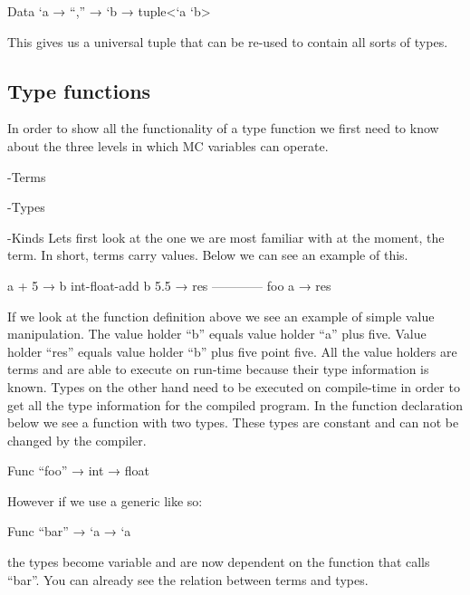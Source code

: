 \begin{code}
	Data `a → “,” → `b → tuple<`a `b>
\end{code}

This gives us a universal tuple that can be re-used to contain all sorts of types.

\subsection{Type functions}

In order to show all the functionality of a type function we first need to know about the three levels in which  MC variables can operate.

-Terms 

-Types

-Kinds
\linebreak
Lets first look at the one we are most familiar with at the moment, the term.
\linebreak
In short, terms carry values. Below we can see an example of this.

\begin{code}
	a + 5 → b
	int-float-add b 5.5 → res
	------------
	foo a → res
\end{code}

If we look at the function definition above we see an example of simple value manipulation. The value holder “b” equals value holder “a” plus five. Value holder “res” equals value holder “b” plus five point five.
\linebreak
All the value holders are terms and are able to execute on run-time because their type information is known.
\linebreak
Types on the other hand need to be executed on compile-time in order to get all the type information for the compiled program.
\linebreak
In the function declaration below we see a function with two types. 
These types are constant and can not be changed by the compiler.

\begin{code}
	Func “foo” → int → float
\end{code}

However if we use a generic like so:

\begin{code}
	Func “bar” → `a → `a 
\end{code}

the types become variable and are now dependent on the function that calls “bar”.
\linebreak
You can already see the relation between terms and types.

